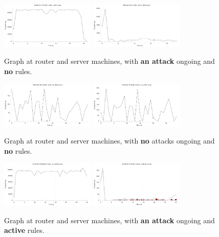 \documentclass[a4paper,11pt,hidelinks]{article}
\begin{document}
\begin{figure}[ht!]
    \centering
    \includegraphics[width=0.4\textwidth]{../drawable/router_attack.pdf}
    \includegraphics[width=0.4\textwidth]{../drawable/server_attack.pdf}
    \caption{Graph at router and server machines, with \textbf{an attack} ongoing and \textbf{no} rules.}
\end{figure}

\begin{figure}[ht!]
    \centering
    \includegraphics[width=0.4\textwidth]{../drawable/router_no_attack.pdf}
    \includegraphics[width=0.4\textwidth]{../drawable/server_no_attack.pdf}
    \caption{Graph at router and server machines, with \textbf{no} attacks ongoing and \textbf{no} rules.}
\end{figure}

\begin{figure}[ht!]
    \centering
    \includegraphics[width=0.4\textwidth]{../drawable/router_rule_attack.pdf}
    \includegraphics[width=0.4\textwidth]{../drawable/server_rule_attack.pdf}
    \caption{Graph at router and server machines, with \textbf{an attack} ongoing and \textbf{active} rules.}
\end{figure}
\end{document}
